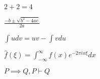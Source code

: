 $2+2=4$

$\frac{-b \pm\sqrt{b^2-4ac}}{2a}$

$\int udv = uv - \int vdu$

$\hat{f}(\xi) = \int_{-\infty}^{\infty}f(x)e^{-2\pi ix\xi}dx$

$P \implies Q, P \vdash Q$

